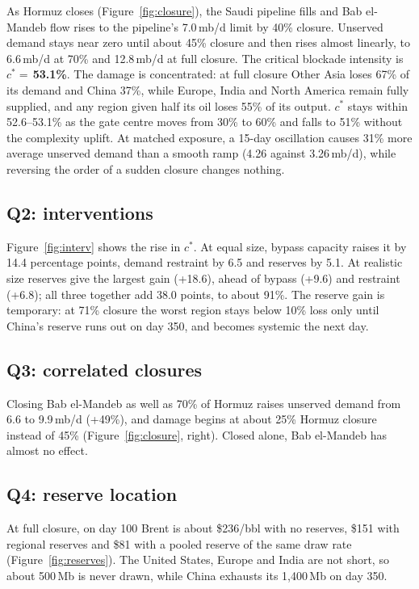 \documentclass[11pt,a4paper]{article}
\begin{document}
As Hormuz closes (Figure~\ref{fig:closure}), the Saudi pipeline fills and Bab el-Mandeb flow rises to the pipeline's 7.0\,mb/d limit by 40\% closure. Unserved demand stays near zero until about 45\% closure and then rises almost linearly, to 6.6\,mb/d at 70\% and 12.8\,mb/d at full closure. The critical blockade intensity is $c^{*}=$\,\textbf{53.1\%}. The damage is concentrated: at full closure Other Asia loses 67\% of its demand and China 37\%, while Europe, India and North America remain fully supplied, and any region given half its oil loses 55\% of its output. $c^{*}$ stays within 52.6--53.1\% as the gate centre moves from 30\% to 60\% and falls to 51\% without the complexity uplift. At matched exposure, a 15-day oscillation causes 31\% more average unserved demand than a smooth ramp (4.26 against 3.26\,mb/d), while reversing the order of a sudden closure changes nothing.

\subsection{Q2: interventions}

Figure~\ref{fig:interv} shows the rise in $c^{*}$. At equal size, bypass capacity raises it by 14.4 percentage points, demand restraint by 6.5 and reserves by 5.1. At realistic size reserves give the largest gain (+18.6), ahead of bypass (+9.6) and restraint (+6.8); all three together add 38.0 points, to about 91\%. The reserve gain is temporary: at 71\% closure the worst region stays below 10\% loss only until China's reserve runs out on day 350, and becomes systemic the next day.

\subsection{Q3: correlated closures}

Closing Bab el-Mandeb as well as 70\% of Hormuz raises unserved demand from 6.6 to 9.9\,mb/d (+49\%), and damage begins at about 25\% Hormuz closure instead of 45\% (Figure~\ref{fig:closure}, right). Closed alone, Bab el-Mandeb has almost no effect.

\subsection{Q4: reserve location}

At full closure, on day 100 Brent is about \$236/bbl with no reserves, \$151 with regional reserves and \$81 with a pooled reserve of the same draw rate (Figure~\ref{fig:reserves}). The United States, Europe and India are not short, so about 500\,Mb is never drawn, while China exhausts its 1,400\,Mb on day 350.
\end{document}

